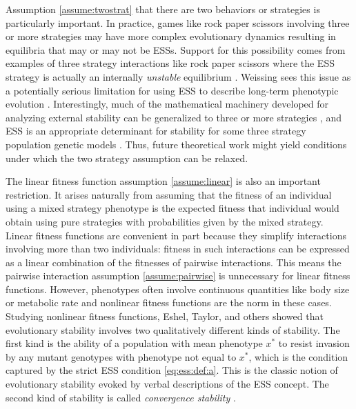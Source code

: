 \documentclass[11pt]{article}
\newcommand{\ess}[1]{#1^*}
\begin{document}
Assumption \ref{assume:twostrat} that there are two behaviors or strategies is particularly important. In practice, games like rock paper scissors \cite{Taylor:Jonker:1978,Zeeman:1980,Weissing:1991,Hofbauer:Sigmund:1998} involving three or more strategies may have more complex evolutionary dynamics resulting in equilibria that may or may not be ESSs. Support for this possibility comes from examples of three strategy interactions like rock paper scissors where the ESS strategy is actually an internally \textit{unstable} equilibrium \cites{Friedman:1991,Weissing:1991}. Weissing sees this issue as a potentially serious limitation for using ESS to describe long-term phenotypic evolution \cite{Weissing:1996}.
Interestingly, much of the mathematical machinery developed for analyzing external stability can be generalized to three or more strategies \cite[e.g.,][]{Eshel:Feldman:1984,Weissing:1996,Eshel:Feldman:1998,Hofbauer:Sigmund:1998}, and ESS is an appropriate determinant for stability for some three strategy population genetic models \cite[e.g., single-locus three-allele models in continuous time][]{Cressman:Hofbauer:1996}. Thus, future theoretical work might yield conditions under which the two strategy assumption can be relaxed.

The linear fitness function assumption \ref{assume:linear} is also an important restriction. It arises naturally from assuming that the fitness of an individual using a mixed strategy phenotype is the expected fitness that individual would obtain using pure strategies with probabilities given by the mixed strategy. Linear fitness functions are convenient in part because they simplify interactions involving more than two individuals: fitness in such interactions can be expressed as a linear combination of the fitnesses of pairwise interactions. This means the pairwise interaction assumption \ref{assume:pairwise} is unnecessary for linear fitness functions. However, phenotypes often involve continuous quantities like body size or metabolic rate and nonlinear fitness functions are the norm in these cases. Studying nonlinear fitness functions, Eshel, Taylor, and others \cite{Eshel:Motro:1981,Eshel:1983,Taylor:1989,Christiansen:1991,Metz:Geritz:1996,Eshel:Motro:1997,Geritz:Kisdi:1998} showed that evolutionary stability involves two qualitatively different kinds of stability. The first kind is the ability of a population with mean phenotype $\ess{x}$ to resist invasion by any mutant genotypes with phenotype not equal to $\ess{x}$, which is the condition captured by the strict ESS condition \eqref{eq:ess:def:a}. This is the classic notion of evolutionary stability evoked by verbal descriptions of the ESS concept. The second kind of stability is called \textit{convergence stability} \cite{Christiansen:1991,Eshel:1996,Geritz:Kisdi:1998}.
\end{document}
